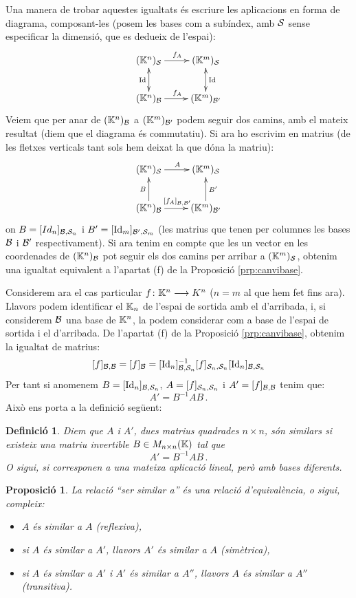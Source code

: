 \documentclass[
  11pt,
]{book}
\numberwithin{dummy}{section}
\theoremstyle{maincolornumbox}
\theoremstyle{blacknumex}
\theoremstyle{blacknumbox}
\newtheorem{definitionT}{Definició}[chapter]
\theoremstyle{maincolornum}
\newtheorem{propositionT}{Proposició}[chapter]
\newenvironment{proposition}{\begin{pBox}\begin{propositionT}}{\end{propositionT}\end{pBox}}
\newenvironment{definition}{\begin{dBox}\begin{definitionT}}{\end{definitionT}\end{dBox}}
\newlength\esp
\begin{document}
Una manera de trobar aquestes igualtats és escriure les aplicacions en
forma de diagrama, composant-les (posem les bases com a subíndex, amb
\(\mathcal{S}\) sense especificar la dimensió, que es dedueix de l'espai):
\[\xymatrix{
(\K^n)_\cals \ar[r]^{f_A} \ar@{<->}[d]_\Id & (\K^m)_\cals \ar@{<->}[d]^\Id \\
(\K^n)_\calb \ar[r]^{f_A} & (\K^m)_{\calb'}}\] Veiem que per anar de
\((\mathbb{K}^n)_{\mathcal{B}}\) a \((\mathbb{K}^m)_{\mathcal{B}'}\) podem seguir dos camins, amb el
mateix resultat (diem que el diagrama és commutatiu). Si ara ho escrivim
en matrius (de les fletxes verticals tant sols hem deixat la que dóna la
matriu):
\[
\xymatrix{
(\K^n)_\cals \ar[r]^{A}  &  (\K^m)_\cals  \\
(\K^n)_\calb \ar[r]^{[f_A]_{\calb,\calb'}} \ar[u]^B & (\K^m)_{\calb'} \ar[u]_{B'}}\]
on \(B=[Id_n]_{\mathcal{B},\mathcal{S}_n}\) i \(B'=[\operatorname{Id}_m]_{\mathcal{B}',\mathcal{S}_m}\) (les
matrius que tenen per columnes les bases \(\mathcal{B}\) i \(\mathcal{B}'\)
respectivament). Si ara tenim en compte que les un vector en les
coordenades de \((\mathbb{K}^n)_{\mathcal{B}}\) pot seguir els dos camins per arribar a
\((\mathbb{K}^m)_{\mathcal{S}}\), obtenim una igualtat equivalent a l'apartat (f) de la
Proposició \ref{prp:canvibase}.

Considerem ara el cas particular \(f\colon \mathbb{K}^n \longrightarrow K^n\) (\(n=m\) al que
hem fet fins ara). Llavors podem identificar el \(\mathbb{K}_n\) de l'espai de
sortida amb el d'arribada, i, si considerem \(\mathcal{B}\) una base de \(\mathbb{K}^n\),
la podem considerar com a base de l'espai de sortida i el d'arribada. De
l'apartat (f) de la Proposició
\ref{prp:canvibase}, obtenim la igualtat de matrius:
\[[f]_{\mathcal{B},\mathcal{B}}=[f]_{\mathcal{B}}=[\operatorname{Id}_n]_{\mathcal{B},\mathcal{S}_n}^{-1} [f]_{\mathcal{S}_n,\mathcal{S}_n} [\operatorname{Id}_n]_{\mathcal{B},\mathcal{S}_n}\]
Per tant si anomenem \(B=[\operatorname{Id}_n]_{\mathcal{B},\mathcal{S}_n}\),
\(A=[f]_{\mathcal{S}_n,\mathcal{S}_n}\) i \(A'=[f]_{\mathcal{B},\mathcal{B}}\) tenim que:
\[A'=B^{-1} A B \,.\] Això ens porta a la definició següent:

\begin{definition}
Diem que \(A\) i \(A'\), dues matrius quadrades \(n\times n\), són \emph{similars}
si existeix una matriu invertible \(B\in M_{n\times n}(\mathbb{K})\) tal que
\[A'=B^{-1}AB \,.\] O sigui, si corresponen a una mateixa aplicació
lineal, però amb bases diferents.
\end{definition}

\begin{proposition}

La relació ``ser similar a'' és una relació d'equivalència, o sigui,
compleix:

\begin{itemize}
\item
  \(A\) és similar a \(A\) (reflexiva),
\item
  si \(A\) és similar a \(A'\), llavors \(A'\) és similar a \(A\) (simètrica),
\item
  si \(A\) és similar a \(A'\) i \(A'\) és similar a \(A''\), llavors \(A\) és
  similar a \(A''\) (transitiva).
\end{itemize}

\end{proposition}
\end{document}
